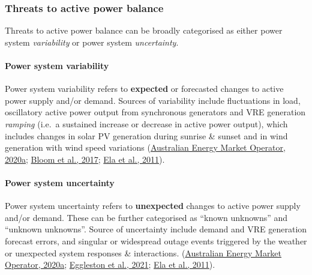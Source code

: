 \documentclass[12pt,a4paper,]{report}
\begin{document}
\hypertarget{sec:lit_review-balancing_threats}{%
\subsubsection{Threats to active power
balance}\label{sec:lit_review-balancing_threats}}

Threats to active power balance can be broadly categorised as either
power system \emph{variability} or power system \emph{uncertainty}.

\hypertarget{power-system-variability}{%
\paragraph{Power system variability}\label{power-system-variability}}

Power system variability refers to \textbf{expected} or forecasted
changes to active power supply and/or demand. Sources of variability
include fluctuations in load, oscillatory active power output from
synchronous generators and VRE generation \emph{ramping} (i.e.~a
sustained increase or decrease in active power output), which includes
changes in solar PV generation during sunrise \& sunset and in wind
generation with wind speed variations
(\protect\hyperlink{ref-australianenergymarketoperatorRenewableIntegrationStudy2020}{Australian
Energy Market Operator, 2020a};
\protect\hyperlink{ref-bloomItIndisputableFive2017}{Bloom et al., 2017};
\protect\hyperlink{ref-elaOperatingReservesVariable2011}{Ela et al.,
2011}).

\hypertarget{power-system-uncertainty}{%
\paragraph{Power system uncertainty}\label{power-system-uncertainty}}

Power system uncertainty refers to \textbf{unexpected} changes to active
power supply and/or demand. These can be further categorised as ``known
unknowns'' and ``unknown unknowns''. Source of uncertainty include
demand and VRE generation forecast errors, and singular or widespread
outage events triggered by the weather or unexpected system responses \&
interactions.
(\protect\hyperlink{ref-australianenergymarketoperatorRenewableIntegrationStudy2020}{Australian
Energy Market Operator, 2020a};
\protect\hyperlink{ref-egglestonSecurityResilienceTechnical2021}{Eggleston
et al., 2021};
\protect\hyperlink{ref-elaOperatingReservesVariable2011}{Ela et al.,
2011}).
\end{document}
